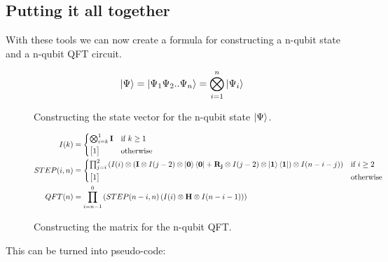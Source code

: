 \subsection{Putting it all together}
With these tools we can now create a formula for constructing a n-qubit state and a n-qubit QFT circuit. 
\begin{figure}[H]
    \begin{align*}
        \ket{\Psi} = \ket{\Psi_1\Psi_2..\Psi_n} = \bigotimes_{i=1}^n \ket{\Psi_i}
    \end{align*}
    \caption{Constructing the state vector for the n-qubit state $\ket{\Psi}$.}
    \label{fig:CPsi}
\end{figure}
\begin{figure}[H]
    \begin{align*}
        I(k) &= 
            \begin{cases*}
                \bigotimes_{i=k}^1\qti
                & if $k\geq 1$ \\
            \begin{bmatrix}1\end{bmatrix}        & otherwise
            \end{cases*}\\
        STEP(i,n) &= 
            \begin{cases*}
            \prod_{j=i}^2  
                \left(
                I(i)
                \otimes
                \left(
                \qti\otimes I(j-2)\otimes\ket{\qtz}\bra{\qtz}
                + 
                \qtr{j}\otimes I(j-2)\otimes\ket{\qto}\bra{\qto}
                \right)
                \otimes
                I(n-i-j)
                \right)& if $i\geq2$ \\
            \begin{bmatrix}1\end{bmatrix}        & otherwise
            \end{cases*}\\
        QFT(n) &= 
        \prod_{i=n-1}^0
            \left(
            STEP(n-i,n)
            \left(
            I(i)\otimes
            \qth\otimes
            I(n-i-1)
            \right)
            \right)
    \end{align*}
    \caption{Constructing the matrix for the n-qubit QFT.}
    \label{fig:CQFT}
\end{figure}
\noindent
This can be turned into pseudo-code: 


